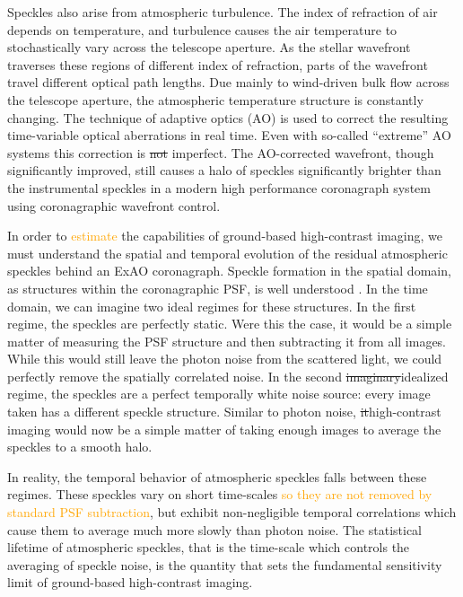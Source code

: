 \documentclass[10pt,preprint]{aastex631}
\newcommand{\ogadd}[1]{\textcolor{orange}{#1}}
\newcommand{\mpfadd}[1]{\textcolor{avocado}{#1}}
\newcommand{\mpfrmv}[1]{\textcolor{avocado}{\sout{#1}}}
\begin{document}
\mpfadd{Speckles also arise from atmospheric turbulence.}  The index of refraction of air depends on temperature, and turbulence causes the air temperature to stochastically vary across the telescope aperture.  As the stellar wavefront traverses these regions of different index of refraction, parts of the wavefront travel different optical path lengths.  Due mainly to wind\mpfadd{-driven bulk flow across the telescope aperture}, the atmospheric temperature structure is constantly changing.  The technique of adaptive optics (AO) is used to correct the resulting time-variable optical aberrations in real time.  Even with so-called ``extreme'' AO systems \citep[ExAO, ][]{2018ARAA..56..315G} this correction is \mpfrmv{not} \mpfadd{im}perfect.  The AO-corrected wavefront, though significantly improved, still causes a halo of speckles significantly brighter than the instrumental speckles in a modern high performance coronagraph system using coronagraphic wavefront control.

In order to \ogadd{estimate} the capabilities of ground-based high-contrast imaging, we must understand the spatial and temporal evolution of the residual atmospheric speckles behind an ExAO coronagraph.  Speckle formation in the spatial domain, as structures within the coronagraphic PSF, is well understood \citep{2001ApJ...558L..71B,2003ApJ...596..702P,2007ApJ...669..642S}.  In the time domain, we can imagine two ideal regimes for these structures.  In the first regime, the speckles are perfectly static.  Were this the case, it would be a simple matter of measuring the PSF structure and then subtracting it from all images.  While this would still leave the photon noise from the scattered light, we could perfectly remove the spatially correlated noise.  In the second \mpfrmv{imaginary}\mpfadd{idealized} regime, the speckles are a perfect temporally white noise source: every image taken has a different speckle structure.  Similar to photon noise, \mpfrmv{it}\mpfadd{high-contrast imaging} would now be a simple matter of taking enough images to average the speckles to a smooth halo.

In reality, the temporal behavior of atmospheric speckles falls between these regimes. These speckles vary on short time-scales \ogadd{so they are not removed by standard PSF subtraction}, but exhibit non-negligible temporal correlations which cause them to average much more slowly than photon noise.  The statistical lifetime of atmospheric speckles, that is the time-scale which controls the averaging of speckle noise, is the quantity that sets the fundamental sensitivity limit of ground-based high-contrast imaging.
\end{document}
